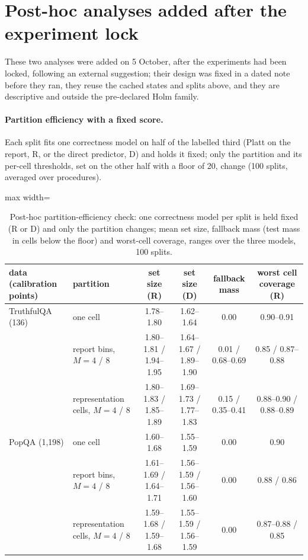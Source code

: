 \documentclass[twoside]{article}
\theoremstyle{definition}
\theoremstyle{remark}
\newcommand{\1}{\mathbf{1}}
\begin{document}
\section{Post-hoc analyses added after the experiment lock}
\label{app:postlock}
These
two analyses were added on 5 October, after the experiments had been locked, following an external
suggestion; their design was fixed in a dated note before they ran, they reuse the cached states and splits
above, and they are descriptive and outside the pre-declared Holm family.

\paragraph{Partition efficiency with a fixed score.} Each split fits one correctness model on half of the
labelled third (Platt on the report, R, or the direct predictor, D) and holds it fixed; only the partition and its
per-cell thresholds, set on the other half with a floor of 20, change (100 splits, averaged over procedures).
\begin{table}[t]
\caption{Post-hoc partition-efficiency check: one correctness model per split is held fixed (R or D) and only the partition changes; mean set size, fallback mass (test mass in cells below the floor) and worst-cell coverage, ranges over the three models, 100 splits.}
\centering\small
\begin{adjustbox}{max width=\textwidth}
\begin{tabular}{llcccc}
\toprule
data (calibration points) & partition & set size (R) & set size (D) & fallback mass & worst cell coverage (R)\\
\midrule
TruthfulQA (136) & one cell & 1.78--1.80 & 1.62--1.64 & 0.00 & 0.90--0.91\\
 & report bins, $M=4$ / 8 & 1.80--1.81 / 1.94--1.95 & 1.64--1.67 / 1.89--1.90 & 0.01 / 0.68--0.69 & 0.85 / 0.87--0.88\\
 & representation cells, $M=4$ / 8 & 1.80--1.83 / 1.85--1.89 & 1.69--1.73 / 1.77--1.83 & 0.15 / 0.35--0.41 & 0.88--0.90 / 0.88--0.89\\
PopQA (1{,}198) & one cell & 1.60--1.68 & 1.55--1.59 & 0.00 & 0.90\\
 & report bins, $M=4$ / 8 & 1.61--1.69 / 1.64--1.71 & 1.56--1.59 / 1.56--1.60 & 0.00 & 0.88 / 0.86\\
 & representation cells, $M=4$ / 8 & 1.59--1.68 / 1.59--1.68 & 1.55--1.59 / 1.56--1.59 & 0.00 & 0.87--0.88 / 0.85\\
\bottomrule
\end{tabular}
\end{adjustbox}
\end{table}
\end{document}
